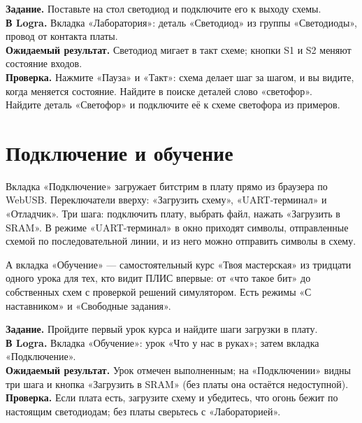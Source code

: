 
\begin{diybox}
\textbf{Задание.} Поставьте на стол светодиод и подключите его к выходу схемы.\\
\textbf{В Logra.} Вкладка «Лаборатория»: деталь «Светодиод» из группы
«Светодиоды», провод от контакта платы.\\
\textbf{Ожидаемый результат.} Светодиод мигает в такт схеме; кнопки S1 и S2
меняют состояние входов.\\
\textbf{Проверка.} Нажмите «Пауза» и «Такт»: схема делает шаг за шагом, и
вы видите, когда меняется состояние. Найдите в поиске деталей слово
«светофор».\\
 Найдите деталь «Светофор» и подключите её к схеме светофора из примеров.
\end{diybox}

\section{Подключение и обучение}

Вкладка «Подключение» загружает битстрим в плату прямо из браузера по
WebUSB. Переключатели вверху: «Загрузить схему», «UART-терминал» и «Отладчик».
Три шага: подключить плату, выбрать файл, нажать «Загрузить в SRAM». В
режиме «UART-терминал» в окно приходят символы, отправленные схемой по
последовательной линии, и из него можно отправить символы в схему.


А вкладка «Обучение» --- самостоятельный курс «Твоя мастерская» из тридцати
одного урока для тех, кто видит ПЛИС впервые: от «что такое бит» до
собственных схем с проверкой решений симулятором. Есть режимы «С наставником»
и «Свободные задания».


\begin{diybox}
\textbf{Задание.} Пройдите первый урок курса и найдите шаги загрузки в плату.\\
\textbf{В Logra.} Вкладка «Обучение»: урок «Что у нас в руках»; затем вкладка
«Подключение».\\
\textbf{Ожидаемый результат.} Урок отмечен выполненным; на «Подключении»
видны три шага и кнопка «Загрузить в SRAM» (без платы она остаётся
недоступной).\\
\textbf{Проверка.} Если плата есть, загрузите схему и убедитесь, что огонь
бежит по настоящим светодиодам; без платы сверьтесь с «Лабораторией».
\end{diybox}


